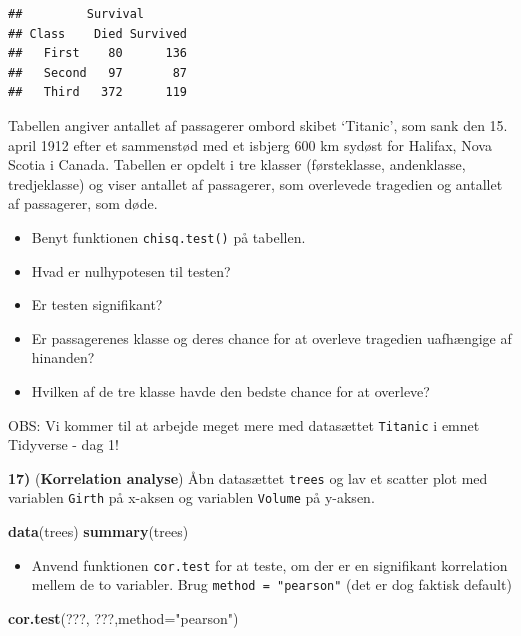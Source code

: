 \documentclass[
]{book}
\newenvironment{Shaded}{\begin{snugshade}}{\end{snugshade}}
\newcommand{\AttributeTok}[1]{\textcolor[rgb]{0.13,0.29,0.53}{#1}}
\newcommand{\FunctionTok}[1]{\textcolor[rgb]{0.13,0.29,0.53}{\textbf{#1}}}
\newcommand{\NormalTok}[1]{#1}
\newcommand{\StringTok}[1]{\textcolor[rgb]{0.31,0.60,0.02}{#1}}
\providecommand{\tightlist}{%
  \setlength{\itemsep}{0pt}\setlength{\parskip}{0pt}}
\theoremstyle{definition}
\theoremstyle{definition}
\theoremstyle{definition}
\theoremstyle{definition}
\theoremstyle{remark}
\begin{document}
\begin{verbatim}
##         Survival
## Class    Died Survived
##   First    80      136
##   Second   97       87
##   Third   372      119
\end{verbatim}

Tabellen angiver antallet af passagerer ombord skibet `Titanic', som sank den 15. april 1912 efter et sammenstød med et isbjerg 600 km sydøst for Halifax, Nova Scotia i Canada. Tabellen er opdelt i tre klasser (førsteklasse, andenklasse, tredjeklasse) og viser antallet af passagerer, som overlevede tragedien og antallet af passagerer, som døde.

\begin{itemize}
\item
  Benyt funktionen \texttt{chisq.test()} på tabellen.
\item
  Hvad er nulhypotesen til testen?
\item
  Er testen signifikant?
\item
  Er passagerenes klasse og deres chance for at overleve tragedien uafhængige af hinanden?
\item
  Hvilken af de tre klasse havde den bedste chance for at overleve?
\end{itemize}

OBS: Vi kommer til at arbejde meget mere med datasættet \texttt{Titanic} i emnet Tidyverse - dag 1!

\textbf{17)} (\textbf{Korrelation analyse}) Åbn datasættet \texttt{trees} og lav et scatter plot med variablen \texttt{Girth} på x-aksen og variablen \texttt{Volume} på y-aksen.

\begin{Shaded}
\begin{Highlighting}[]
\FunctionTok{data}\NormalTok{(trees)}
\FunctionTok{summary}\NormalTok{(trees)}
\end{Highlighting}
\end{Shaded}

\begin{itemize}
\tightlist
\item
  Anvend funktionen \texttt{cor.test} for at teste, om der er en signifikant korrelation mellem de to variabler. Brug \texttt{method\ =\ "pearson"} (det er dog faktisk default)
\end{itemize}

\begin{Shaded}
\begin{Highlighting}[]
\FunctionTok{cor.test}\NormalTok{(???, ???,}\AttributeTok{method=}\StringTok{"pearson"}\NormalTok{)}
\end{Highlighting}
\end{Shaded}
\end{document}
